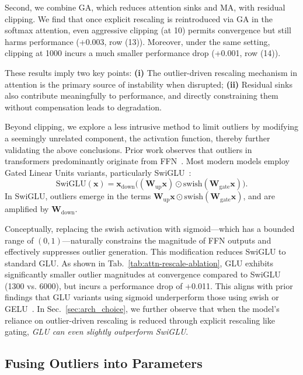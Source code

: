 \documentclass{article} %
\begin{document}
Second, we combine GA, which reduces attention sinks and MA, with residual clipping. 
We find that once explicit rescaling is reintroduced via GA in the softmax attention, even aggressive clipping (at 10) permits convergence but still harms performance (+0.003, row (13)). 
Moreover, under the same setting, clipping at 1000 incurs a much smaller performance drop (+0.001, row (14)).

These results imply two key points:  
\textbf{(i)} The outlier-driven rescaling mechanism in attention is the primary source of instability when disrupted;  
\textbf{(ii)} Residual sinks also contribute meaningfully to performance, and directly constraining them without compensation leads to degradation.


Beyond clipping, we explore a less intrusive method to limit outliers by modifying a seemingly unrelated component, the activation function, thereby further validating the above conclusions. 
Prior work observes that outliers in transformers predominantly originate from FFN~\citep{oh2024house, yona2025interpreting}. Most modern models employ Gated Linear Units variants, particularly SwiGLU~\citep{shazeer2020glu}:  
\[
\text{SwiGLU}(\mathbf{x}) = \mathbf{x}_{\text{down}} \big( (\mathbf{W}_{\text{up}} \mathbf{x}) \odot \text{swish}(\mathbf{W}_{\text{gate}} \mathbf{x}) \big).
\]  
In SwiGLU, outliers emerge in the terms \(\mathbf{W}_{\text{up}} \mathbf{x} \odot\text{swish}(\mathbf{W}_{\text{gate}} \mathbf{x})\), and are amplified by \(\mathbf{W}_{\text{down}}\).



Conceptually, replacing the swish activation with sigmoid—which has a bounded range of \((0, 1)\)—naturally constrains the magnitude of FFN outputs and effectively suppresses outlier generation. This modification reduces SwiGLU to standard GLU. As shown in Tab.~\ref{tab:attn-rescale-ablation}, GLU exhibits significantly smaller outlier magnitudes at convergence compared to SwiGLU (1300 vs. 6000), but incurs a performance drop of +0.011. 
This aligns with prior findings that GLU variants using sigmoid underperform those using swish or GELU~\citep{shazeer2020glu}.
In Sec.~\ref{sec:arch_choice}, we further observe that when the model’s reliance on outlier-driven rescaling is reduced through explicit rescaling like gating, \textit{GLU can even slightly outperform SwiGLU}.

\subsection{Fusing Outliers into Parameters}
\label{sec:pre_affine}
\end{document}
